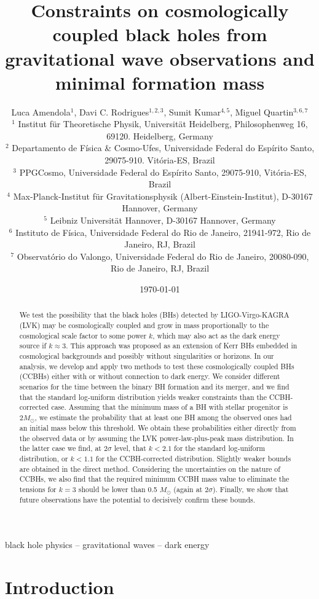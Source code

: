 \documentclass[fleqn,usenatbib,useAMS]{mnras}
\title[Constraints on cosmologically coupled black holes]{Constraints on cosmologically coupled black holes from gravitational wave observations and minimal formation mass}
\author[L.~Amendola, D.~C.~Rodrigues, S.~Kumar, M.~Quartin]{
  Luca Amendola$^{1}$, 
  Davi C. Rodrigues$^{1, 2, 3}$,
  Sumit Kumar$^{4, 5}$,
  Miguel Quartin$^{3, 6, 7}$\\ 
  $^{1}$ Institut für Theoretische Physik, Universität Heidelberg, Philosophenweg 16, 69120. Heidelberg, Germany\\
  $^{2}$ Departamento de Física \& Cosmo-Ufes, Universidade Federal do Espírito Santo, 29075-910. Vitória\;-\;ES, Brazil\\
  $^{3}$ PPGCosmo, Universidade Federal do Espírito Santo, 29075-910, Vitória\;-\;ES, Brazil\\
  $^{4}$ Max-Planck-Institut für Gravitationsphysik (Albert-Einstein-Institut), D-30167 Hannover, Germany\\
  $^{5}$ Leibniz Universität Hannover, D-30167 Hannover, Germany\\
  $^{6}$ Instituto de Física, Universidade Federal do Rio de Janeiro, 21941-972, Rio de Janeiro, RJ, Brazil\\
  $^{7}$ Observatório do Valongo, Universidade Federal do Rio de Janeiro, 20080-090, Rio de Janeiro, RJ, Brazil
}
\date{\today}
\begin{document}
\label{firstpage}
\pagerange{\pageref{firstpage}--\pageref{lastpage}}
\maketitle

\begin{abstract}
    We test the possibility that the black holes (BHs) detected by LIGO-Virgo-KAGRA (LVK) may be cosmologically coupled and grow in mass proportionally to the cosmological scale factor to some power $k$, which may also act as the dark energy source if $k\approx 3$.
    This approach was proposed as an extension of Kerr BHs embedded in cosmological backgrounds and possibly without singularities or horizons. In our analysis, we develop and apply two methods to test these cosmologically coupled BHs (CCBHs) either with or without connection to dark energy.  We consider different scenarios for the time between the binary BH formation and its merger, and we find that the standard log-uniform distribution yields weaker constraints than the CCBH-corrected case. Assuming that the minimum mass of a BH with stellar progenitor is $2M_\odot$, we estimate the probability that at least one BH among the observed ones had an initial mass below this threshold.  
    We obtain these probabilities either directly from the observed data or by assuming the LVK power-law-plus-peak mass distribution.  In the latter case we 
    find, at $2\sigma$ level, that $k < 2.1$ for the standard log-uniform distribution, or $k < 1.1$ for the CCBH-corrected distribution. Slightly {weaker} bounds are obtained in the direct method. Considering the uncertainties on the nature of CCBHs, we also find that the required minimum CCBH mass value to eliminate the tensions for $k=3$ should be lower than 0.5 $M_\odot$ {(again at 2$\sigma$)}. {Finally, we show that future observations have the potential to decisively confirm these bounds.}
\end{abstract}

\begin{keywords}
   black hole physics -- gravitational waves -- dark energy
\end{keywords}

\section{Introduction} \label{sec:intro}
\end{document}
